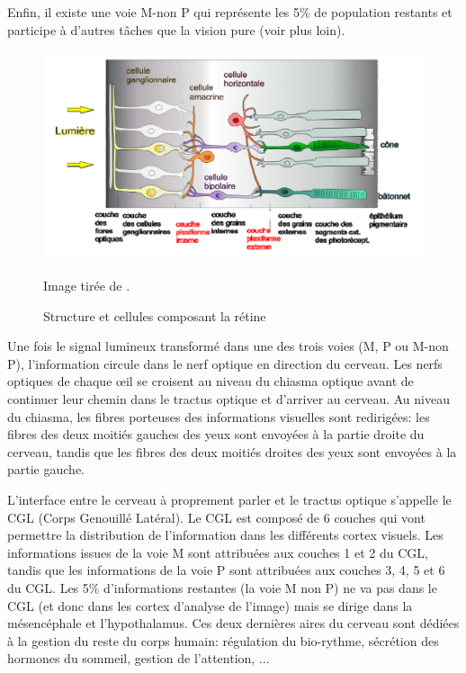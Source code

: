 	\par Enfin, il existe une voie M-non P qui représente les 5\% de population restants et participe à d'autres tâches que la vision pure (voir plus loin). 
	
	\begin{figure}[h]
		\centering
		\includegraphics[scale=.45]{Figures/StructureRetinae}
		\caption{Structure et cellules composant la rétine}{Image tirée de  \citep{anses_effets_2014}.}
		\label{fig:structure_retine}
	\end{figure}
	
	\par Une fois le signal lumineux transformé dans une des trois voies (M, P ou M-non P), l'information circule dans le nerf optique en direction du cerveau. Les nerfs optiques de chaque œil se croisent au niveau du chiasma optique avant de continuer leur chemin dans le tractus optique et d'arriver au cerveau. Au niveau du chiasma, les fibres porteuses des informations visuelles sont redirigées: les fibres des deux moitiés gauches des yeux sont envoyées à la partie droite du cerveau, tandis que les fibres des deux moitiés droites des yeux sont envoyées à la partie gauche.
	
	\par L'interface entre le cerveau à proprement parler et le tractus optique s'appelle le CGL (Corps Genouillé Latéral). Le CGL est composé de 6 couches qui vont permettre la distribution de l'information dans les différents cortex visuels. Les informations issues de la voie M sont attribuées aux couches 1 et 2 du CGL, tandis que les informations de la voie P sont attribuées aux couches 3, 4, 5 et 6 du CGL. Les 5\% d'informations restantes (la voie M non P) ne va pas dans le CGL (et donc dans les cortex d'analyse de l'image) mais se dirige dans la mésencéphale et l'hypothalamus. Ces deux dernières aires du cerveau sont dédiées à la gestion du reste du corps humain: régulation du bio-rythme, sécrétion des hormones du sommeil, gestion de l'attention, ...
	
